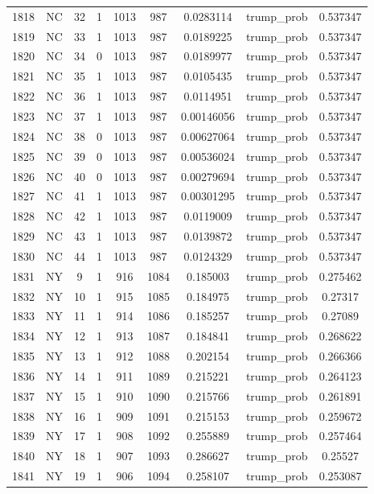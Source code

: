 \documentclass[12pt,a4paper]{article}
\begin{document}
\begin{tabular}{r|cccccccc}
	1818 & NC & 32 & 1 & 1013 & 987 & 0.0283114 & trump\_prob & 0.537347 \\
	1819 & NC & 33 & 1 & 1013 & 987 & 0.0189225 & trump\_prob & 0.537347 \\
	1820 & NC & 34 & 0 & 1013 & 987 & 0.0189977 & trump\_prob & 0.537347 \\
	1821 & NC & 35 & 1 & 1013 & 987 & 0.0105435 & trump\_prob & 0.537347 \\
	1822 & NC & 36 & 1 & 1013 & 987 & 0.0114951 & trump\_prob & 0.537347 \\
	1823 & NC & 37 & 1 & 1013 & 987 & 0.00146056 & trump\_prob & 0.537347 \\
	1824 & NC & 38 & 0 & 1013 & 987 & 0.00627064 & trump\_prob & 0.537347 \\
	1825 & NC & 39 & 0 & 1013 & 987 & 0.00536024 & trump\_prob & 0.537347 \\
	1826 & NC & 40 & 0 & 1013 & 987 & 0.00279694 & trump\_prob & 0.537347 \\
	1827 & NC & 41 & 1 & 1013 & 987 & 0.00301295 & trump\_prob & 0.537347 \\
	1828 & NC & 42 & 1 & 1013 & 987 & 0.0119009 & trump\_prob & 0.537347 \\
	1829 & NC & 43 & 1 & 1013 & 987 & 0.0139872 & trump\_prob & 0.537347 \\
	1830 & NC & 44 & 1 & 1013 & 987 & 0.0124329 & trump\_prob & 0.537347 \\
	1831 & NY & 9 & 1 & 916 & 1084 & 0.185003 & trump\_prob & 0.275462 \\
	1832 & NY & 10 & 1 & 915 & 1085 & 0.184975 & trump\_prob & 0.27317 \\
	1833 & NY & 11 & 1 & 914 & 1086 & 0.185257 & trump\_prob & 0.27089 \\
	1834 & NY & 12 & 1 & 913 & 1087 & 0.184841 & trump\_prob & 0.268622 \\
	1835 & NY & 13 & 1 & 912 & 1088 & 0.202154 & trump\_prob & 0.266366 \\
	1836 & NY & 14 & 1 & 911 & 1089 & 0.215221 & trump\_prob & 0.264123 \\
	1837 & NY & 15 & 1 & 910 & 1090 & 0.215766 & trump\_prob & 0.261891 \\
	1838 & NY & 16 & 1 & 909 & 1091 & 0.215153 & trump\_prob & 0.259672 \\
	1839 & NY & 17 & 1 & 908 & 1092 & 0.255889 & trump\_prob & 0.257464 \\
	1840 & NY & 18 & 1 & 907 & 1093 & 0.286627 & trump\_prob & 0.25527 \\
	1841 & NY & 19 & 1 & 906 & 1094 & 0.258107 & trump\_prob & 0.253087 \\

\end{tabular}
\end{document}
